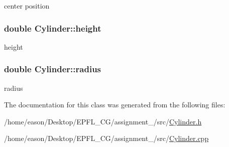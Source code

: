 center position 

\subsubsection[{\texorpdfstring{height}{height}}]{\setlength{\rightskip}{0pt plus 5cm}double Cylinder\+::height\hspace{0.3cm}{\ttfamily [private]}}\hypertarget{classCylinder_a211cebc37f1025850cdacffe1badb578}{}\label{classCylinder_a211cebc37f1025850cdacffe1badb578}


height 

\subsubsection[{\texorpdfstring{radius}{radius}}]{\setlength{\rightskip}{0pt plus 5cm}double Cylinder\+::radius\hspace{0.3cm}{\ttfamily [private]}}\hypertarget{classCylinder_a8a825799285bcf60b49b8aef0459b498}{}\label{classCylinder_a8a825799285bcf60b49b8aef0459b498}


radius 



The documentation for this class was generated from the following files\+:\begin{DoxyCompactItemize}
\item 
/home/eason/\+Desktop/\+E\+P\+F\+L\+\_\+\+C\+G/assignment\+\_/src/\hyperlink{Cylinder_8h}{Cylinder.\+h}\item 
/home/eason/\+Desktop/\+E\+P\+F\+L\+\_\+\+C\+G/assignment\+\_/src/\hyperlink{Cylinder_8cpp}{Cylinder.\+cpp}\end{DoxyCompactItemize}
